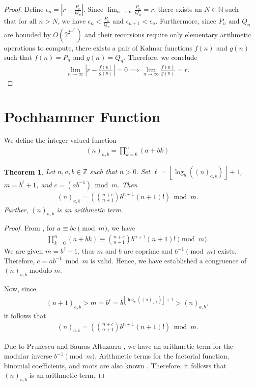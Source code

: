 \documentclass[10pt,a4paper]{article}
\theoremstyle{plain}
\newtheorem{theorem}{Theorem}[section]
\newcommand{\floor}[1]{\left\lfloor #1 \right\rfloor}
\newcommand{\Z}{\mathbb{Z}}
\begin{document}
\begin{proof}
Define $\epsilon_n = \left| r - \frac{P_n}{Q_n} \right|$. Since $\lim_{n\to\infty} \frac{P_n}{Q_n} = r$, there exists an $N \in \mathbb{N}$ such that for all $n > N$, we have $\epsilon_n < \frac{P_n}{Q_n}$ and $\epsilon_{n+1} < \epsilon_n$. Furthermore, since $P_n$ and $Q_n$ are bounded by $O(2^{2^{\ldots^{2^n}}})$ and their recursions require only elementary arithmetic operations to compute, there exists a pair of Kalmar functions $f(n)$ and $g(n)$ such that $f(n)=P_n$ and $g(n) = Q_n$. Therefore, we conclude
\begin{align*}
\lim_{n\to\infty} \left| r - \frac{f(n)}{g(n)} \right| = 0 
\implies \lim_{n\to\infty} \frac{f(n)}{g(n)} = r .    
\end{align*}
\end{proof}

\section{Pochhammer Function}
We define the integer-valued function
\begin{align*}
(n)_{a,b} = \prod_{k=0}^n (a+bk)
\end{align*}

\begin{theorem} \label{proof:pochhammer1}
Let $n,a,b \in \Z$ such that $n > 0$.
Set $\ell = \floor{\log_b((n)_{a,b})}+1$, $m = b^{\ell}+1$, and $c = (ab^{-1}) \bmod m$. Then
\begin{align*}
(n)_{a,b} = \left( \binom{n+c}{n+1} b^{n+1} (n+1)! \right) \bmod m .
\end{align*}
Further, $(n)_{a,b}$ is an arithmetic term.
\end{theorem}
\begin{proof}
From \cite{matiyasevich1993hilbert}, for $a \equiv bc \pmod{m}$, we have
\begin{align} \label{formula:matiyasevich1}
\prod_{k=0}^n (a+bk) \equiv \binom{n+c}{n+1} b^{n+1} (n+1)! \pmod{m} .
\end{align}
We are given $m = b^{\ell}+1$, thus $m$ and $b$ are coprime and $b^{-1} \pmod{m}$ exists. Therefore, $c = ab^{-1} \bmod m$ is valid. Hence, we have established a congruence of $(n)_{a,b}$ modulo $m$.

Now, since
\begin{align*}
(n+1)_{a,b} > m = b^{\ell} = b^{\floor{\log_b((n)_{a,b})}+1} > (n)_{a,b} ,
\end{align*}
it follows that
\begin{align*}
(n)_{a,b} = \left( \binom{n+c}{n+1} b^{n+1} (n+1)! \right) \bmod m .
\end{align*}

Due to Prunescu and Sauras-Altuzarra \cite{prunescu2024factorial}, we have an arithmetic term for the modular inverse $b^{-1} \pmod{m}$. Arithmetic terms for the factorial function, binomial coefficients, and roots are also known \cite{robinson1952arithmetic,shunia2023simple,shunia2024polynomial, prunescu2024factorial}. Therefore, it follows that $(n)_{a,b}$ is an arithmetic term.
\end{proof}
\end{document}

